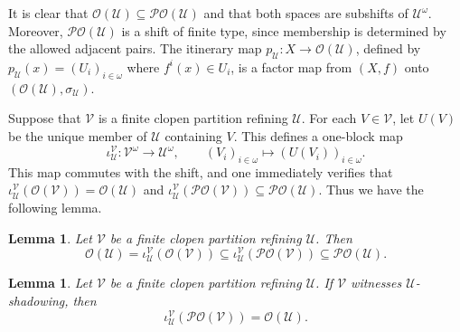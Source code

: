 \documentclass[12pt]{amsart}
\newtheorem{lemma}[theorem]{Lemma}
\theoremstyle{definition}
\numberwithin{equation}{section}
\theoremstyle{remark}
\begin{document}
It is clear that $\mathcal O(\mathcal U)\subseteq\mathcal{PO}(\mathcal U)$ and
that both spaces are subshifts of $\mathcal U^\omega$. Moreover,
$\mathcal{PO}(\mathcal U)$ is a shift of finite type, since membership is
determined by the allowed adjacent pairs. The itinerary map
$p_{\mathcal U}:X\to\mathcal O(\mathcal U)$, defined by
$p_{\mathcal U}(x)=(U_i)_{i\in\omega}$ where $f^i(x)\in U_i$, is a factor map
from $(X,f)$ onto $(\mathcal O(\mathcal U),\sigma_{\mathcal U})$.

Suppose that $\mathcal V$ is a finite clopen partition refining $\mathcal U$.
For each $V\in\mathcal V$, let $U(V)$ be the unique member of $\mathcal U$
containing $V$. This defines a one-block map
\[
    \iota_{\mathcal U}^{\mathcal V}:\mathcal V^\omega\to\mathcal U^\omega,
    \qquad
    (V_i)_{i\in\omega}\mapsto (U(V_i))_{i\in\omega}.
\]
This map commutes with the shift, and one immediately verifies that
$\iota_{\mathcal U}^{\mathcal V}(\mathcal O(\mathcal V))
=\mathcal O(\mathcal U)$ and
$\iota_{\mathcal U}^{\mathcal V}(\mathcal{PO}(\mathcal V))
\subseteq \mathcal{PO}(\mathcal U)$. Thus we have the following lemma.

\begin{lemma}\label{opo}\cite[Lemma 13]{GM}
Let $\mathcal V$ be a finite clopen partition refining $\mathcal U$. Then
\[
    \mathcal O(\mathcal U)
    =
    \iota_{\mathcal U}^{\mathcal V}(\mathcal O(\mathcal V))
    \subseteq
    \iota_{\mathcal U}^{\mathcal V}(\mathcal{PO}(\mathcal V))
    \subseteq
    \mathcal{PO}(\mathcal U).
\]
\end{lemma}

\begin{lemma}\label{sur}
Let $\mathcal V$ be a finite clopen partition refining $\mathcal U$. If
$\mathcal V$ witnesses $\mathcal U$-shadowing, then
\[
    \iota_{\mathcal U}^{\mathcal V}(\mathcal{PO}(\mathcal V))
    =
    \mathcal O(\mathcal U).
\]
\end{lemma}
\end{document}
